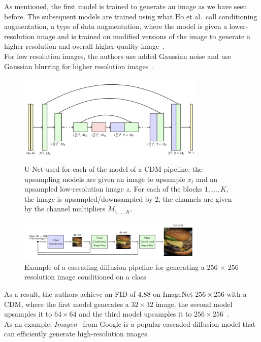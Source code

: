 \documentclass[twoside]{article}
\numberwithin{equation}{section}
\numberwithin{figure}{section}
\begin{document}
As mentioned, the first model is trained to generate an image as we have seen before. The subsequent models are trained using what Ho et al.\ call conditioning augmentation, a type of data augmentation, where the model is given a lower-resolution image and is trained on modified versions of the image to generate a higher-resolution and overall higher-quality image~\cite{ho2021cascaded}. \\
For low resolution images, the authors use added Gaussian noise and use Gaussian blurring for higher resolution images~\cite{ho2021cascaded}.
\begin{figure}[h]
  \begin{center}
    \includegraphics[width=0.8\textwidth]{images/cascadedUnet.png}
    \caption{U-Net used for each of the model of a CDM pipeline: the upsampling models are given an image to upsample $x_t$ and an upsampled low-resolution image $z$. For each of the blocks $1, \dots, K$, the image is upsampled/downsampled by 2, the channels are given by the channel multipliers $M_{1, \dots, K}$.~\cite{ho2021cascaded}}
  \end{center}
\end{figure}
\begin{figure}[h]
  \begin{center}
    \includegraphics[width=0.8\textwidth]{images/cascading.png}
    \caption{Example of a cascading diffusion pipeline for generating a 256 $\times$ 256 resolution image conditioned on a class~\cite{ho2021cascaded}}
  \end{center}
\end{figure}

As a result, the authors achieve an FID of $4.88$ on ImageNet $256 \times 256$ with a CDM, where the first model generates a $32 \times 32$ image, the second model upsamples it to $64 \times 64$ and the third model upsamples it to $256 \times 256$~\cite{ho2021cascaded}. \\
As an example, \textit{Imagen}~\cite{saharia2022photorealistic} from Google is a popular cascaded diffusion model that can efficiently generate high-resolution images.
\end{document}
